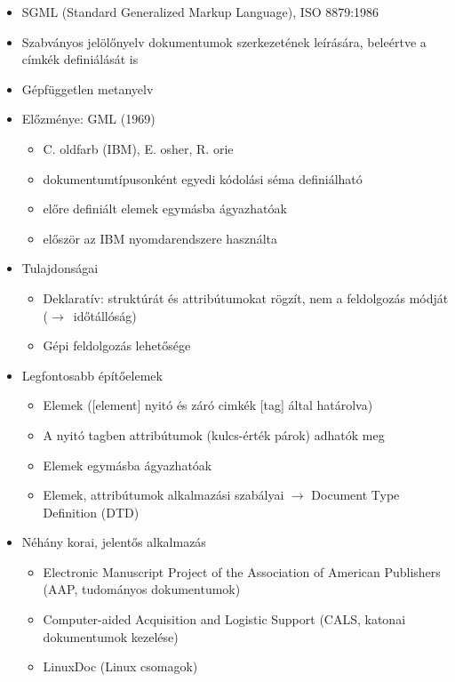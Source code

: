 \begin{frame}
  \begin{itemize}
    \item SGML (Standard Generalized Markup Language), ISO 8879:1986
    \item Szabványos jelölőnyelv dokumentumok szerkezetének leírására,
beleértve a címkék definiálását is
    \item Gépfüggetlen metanyelv
    \item Előzménye: GML (1969)
    \begin{itemize}
      \item C. oldfarb (IBM), E. osher, R. orie
      \item dokumentumtípusonként egyedi kódolási séma definiálható
      \item előre definiált elemek egymásba ágyazhatóak
      \item először az IBM nyomdarendszere használta
    \end{itemize}
    \item Tulajdonságai
    \begin{itemize}
      \item Deklaratív: struktúrát és attribútumokat rögzít, nem a feldolgozás módját ($\to$~időtállóság)
      \item Gépi feldolgozás lehetősége
    \end{itemize}
  \end{itemize}
\end{frame}

\begin{frame}
  \begin{itemize}
    \item Legfontosabb építőelemek
    \begin{itemize}
      \item Elemek ([element] nyitó és záró cimkék [tag] által határolva)
      \item A nyitó tagben attribútumok (kulcs-érték párok) adhatók meg
      \item Elemek egymásba ágyazhatóak
      \item Elemek, attribútumok alkalmazási szabályai $\to$ Document Type Definition (DTD)
    \end{itemize}
    \item Néhány korai, jelentős alkalmazás
    \begin{itemize}
      \item Electronic Manuscript Project of the Association of American Publishers (AAP, tudományos dokumentumok)
      \item Computer-aided Acquisition and Logistic Support (CALS, katonai dokumentumok kezelése)
      \item LinuxDoc (Linux csomagok)
    \end{itemize}
  \end{itemize}
\end{frame}

